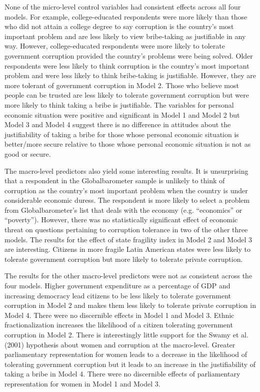 \documentclass[11pt,]{article}
\begin{document}
None of the micro-level control variables had consistent effects across
all four models. For example, college-educated respondents were more
likely than those who did not attain a college degree to say corruption
is the country's most important problem and are less likely to view
bribe-taking as justifiable in any way. However, college-educated
respondents were more likely to tolerate government corruption provided
the country's problems were being solved. Older respondents were less
likely to think corruption is the country's most important problem and
were less likely to think bribe-taking is justifiable. However, they are
more tolerant of government corruption in Model 2. Those who believe
most people can be trusted are less likely to tolerate government
corruption but were more likely to think taking a bribe is justifiable.
The variables for personal economic situation were positive and
significant in Model 1 and Model 2 but Model 3 and Model 4 suggest there
is no difference in attitudes about the justifiability of taking a bribe
for those whose personal economic situation is better/more secure
relative to those whose personal economic situation is not as good or
secure.

The macro-level predictors also yield some interesting results. It is
unsurprising that a respondent in the Globalbarometer sample is unlikely
to think of corruption as the country's most important problem when the
country is under considerable economic duress. The respondent is more
likely to select a problem from Globalbarometer's list that deals with
the economy (e.g. ``economics'' or ``poverty''). However, there was no
statistically significant effect of economic threat on questions
pertaining to corruption tolerance in two of the other three models. The
results for the effect of state fragility index in Model 2 and Model 3
are interesting. Citizens in more fragile Latin American states were
less likely to tolerate government corruption but more likely to
tolerate private corruption.

The results for the other macro-level predictors were not as consistent
across the four models. Higher government expenditure as a percentage of
GDP and increasing democracy lead citizens to be less likely to tolerate
government corruption in Model 2 and makes them less likely to tolerate
private corruption in Model 4. There were no discernible effects in
Model 1 and Model 3. Ethnic fractionalization increases the likelihood
of a citizen tolerating government corruption in Model 2. There is
interestingly little support for the Swamy et al. (2001) hypothesis
about women and corruption at the macro-level. Greater parliamentary
representation for women leads to a decrease in the likelihood of
tolerating government corruption but it leads to an increase in the
justifiability of taking a bribe in Model 4. There were no discernible
effects of parliamentary representation for women in Model 1 and Model
3.
\end{document}
